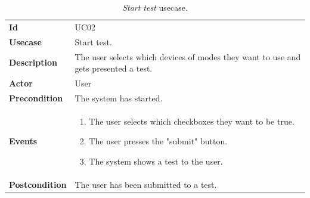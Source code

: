 \begin{table}[h!t]
    \centering
    \caption{\emph{Start test} usecase.}
    \label{tab:uc:test}
    \centering
    \begin{tabular}{l | p{80mm}}
        \textbf{Id}            & UC02                                                                                \\
        \textbf{Usecase}       & Start test.                                                                         \\
        \textbf{Description}   & The user selects which devices of modes they want to use and gets presented a test. \\
        \textbf{Actor}         & User                                                                                \\
        \textbf{Precondition}  & The system has started.                                                             \\
        \textbf{Events}        & \begin{enumerate}
            \item The user selects which checkboxes they want to be true.
            \item The user presses the "submit" button.
            \item The system shows a test to the user.
        \end{enumerate}                                                           \\
        \textbf{Postcondition} & The user has been submitted to a test.
    \end{tabular}
\end{table}

